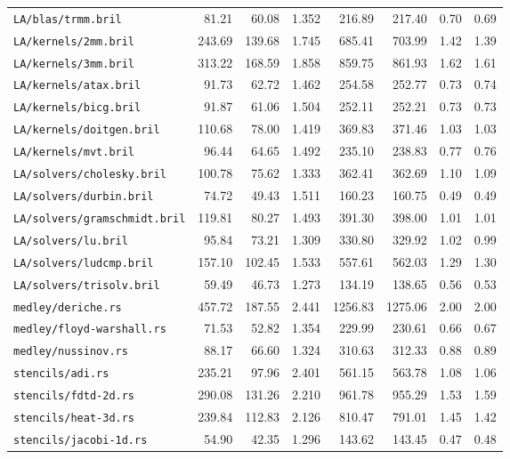 \begin{longtable}{p{48mm}rrrrrrr}
\nolinkurl{LA/blas/trmm.bril} & 81.21 & 60.08 & 1.352 & 216.89 & 217.40 & 0.70 & 0.69 \\
\nolinkurl{LA/kernels/2mm.bril} & 243.69 & 139.68 & 1.745 & 685.41 & 703.99 & 1.42 & 1.39 \\
\nolinkurl{LA/kernels/3mm.bril} & 313.22 & 168.59 & 1.858 & 859.75 & 861.93 & 1.62 & 1.61 \\
\nolinkurl{LA/kernels/atax.bril} & 91.73 & 62.72 & 1.462 & 254.58 & 252.77 & 0.73 & 0.74 \\
\nolinkurl{LA/kernels/bicg.bril} & 91.87 & 61.06 & 1.504 & 252.11 & 252.21 & 0.73 & 0.73 \\
\nolinkurl{LA/kernels/doitgen.bril} & 110.68 & 78.00 & 1.419 & 369.83 & 371.46 & 1.03 & 1.03 \\
\nolinkurl{LA/kernels/mvt.bril} & 96.44 & 64.65 & 1.492 & 235.10 & 238.83 & 0.77 & 0.76 \\
\nolinkurl{LA/solvers/cholesky.bril} & 100.78 & 75.62 & 1.333 & 362.41 & 362.69 & 1.10 & 1.09 \\
\nolinkurl{LA/solvers/durbin.bril} & 74.72 & 49.43 & 1.511 & 160.23 & 160.75 & 0.49 & 0.49 \\
\nolinkurl{LA/solvers/gramschmidt.bril} & 119.81 & 80.27 & 1.493 & 391.30 & 398.00 & 1.01 & 1.01 \\
\nolinkurl{LA/solvers/lu.bril} & 95.84 & 73.21 & 1.309 & 330.80 & 329.92 & 1.02 & 0.99 \\
\nolinkurl{LA/solvers/ludcmp.bril} & 157.10 & 102.45 & 1.533 & 557.61 & 562.03 & 1.29 & 1.30 \\
\nolinkurl{LA/solvers/trisolv.bril} & 59.49 & 46.73 & 1.273 & 134.19 & 138.65 & 0.56 & 0.53 \\
\nolinkurl{medley/deriche.rs} & 457.72 & 187.55 & 2.441 & 1256.83 & 1275.06 & 2.00 & 2.00 \\
\nolinkurl{medley/floyd-warshall.rs} & 71.53 & 52.82 & 1.354 & 229.99 & 230.61 & 0.66 & 0.67 \\
\nolinkurl{medley/nussinov.rs} & 88.17 & 66.60 & 1.324 & 310.63 & 312.33 & 0.88 & 0.89 \\
\nolinkurl{stencils/adi.rs} & 235.21 & 97.96 & 2.401 & 561.15 & 563.78 & 1.08 & 1.06 \\
\nolinkurl{stencils/fdtd-2d.rs} & 290.08 & 131.26 & 2.210 & 961.78 & 955.29 & 1.53 & 1.59 \\
\nolinkurl{stencils/heat-3d.rs} & 239.84 & 112.83 & 2.126 & 810.47 & 791.01 & 1.45 & 1.42 \\
\nolinkurl{stencils/jacobi-1d.rs} & 54.90 & 42.35 & 1.296 & 143.62 & 143.45 & 0.47 & 0.48 \\

\end{longtable}
